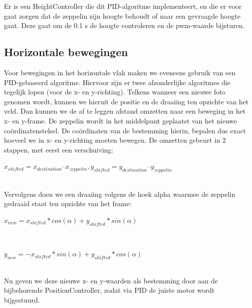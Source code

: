 \documentclass[tt]{penoverslag}
\begin{document}
Er is een HeightController die dit PID-algoritme implementeert, en die er voor gaat zorgen dat de zeppelin zijn hoogte behoudt of naar een gevraagde hoogte gaat. Deze gaat om de 0.1 s de hoogte controleren en de pwm-waarde bijsturen. \\

\subsection{Horizontale bewegingen}
Voor bewegingen in het horizontale vlak maken we eveneens gebruik van een PID-gebaseerd algoritme. Hiervoor zijn er twee afzonderlijke algoritmes die tegelijk lopen (voor de x- en y-richting). Telkens wanneer een nieuwe foto genomen wordt, kunnen we hieruit de positie en de draaiing ten opzichte van het veld. Dan kunnen we de af te leggen afstand omzetten naar een beweging in het x- en y-frame. De zeppelin wordt in het middelpunt geplaatst van het nieuwe co\"{o}rdinatenstelsel. De co\"{o}rdinaten van de bestemming hierin, bepalen dus exact hoeveel we in x- en y-richting moeten bewegen. De omzetten gebeurt in 2 stappen, met eerst een verschuiving:\\
\centerline{$x_{shifted} = x_{destination} – x_{zeppelin}, y_{shifted} = y_{destination} – y_{zeppelin}$}\\

Vervolgens doen we een draaiing volgens de hoek alpha waarmee de zeppelin gedraaid staat ten opzichte van het frame:\\
\centerline{$x_{new} = x_{shifted}*cos(\alpha) + y_{shifted}*sin(\alpha)$}\\
\centerline{$y_{new} = -x_{shifted}*sin(\alpha) + y_{shifted}*cos(\alpha)$}\\

Nu geven we deze nieuwe x- en y-waarden als bestemming door aan de bijbehorende PositionController, zodat via PID de juiste motor wordt bijgestuurd.
\end{document}
